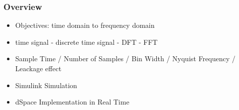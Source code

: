 \begin{frame}
  \frametitle{Overview}
  \begin{itemize}
  \item Objectives: time domain to frequency domain
  \item time signal - discrete time signal - DFT - FFT
  \item Sample Time / Number of  Samples / Bin Width / Nyquist Frequency / Leackage effect
  \item Simulink Simulation
  \item dSpace Implementation in Real Time
   
  \end{itemize}
\end{frame}


